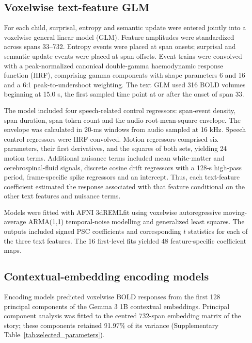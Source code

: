 \subsection{Voxelwise text-feature GLM}
For each child, surprisal, entropy and semantic update were entered jointly into a voxelwise general linear model (GLM). Feature amplitudes were standardized across spans 33--732. Entropy events were placed at span onsets; surprisal and semantic-update events were placed at span offsets. Event trains were convolved with a peak-normalized canonical double-gamma haemodynamic response function (HRF), comprising gamma components with shape parameters 6 and 16 and a 6:1 peak-to-undershoot weighting. The text GLM used 316 BOLD volumes beginning at 15.0 s, the first sampled time point at or after the onset of span 33.

The model included four speech-related control regressors: span-event density, span duration, span token count and the audio root-mean-square envelope. The envelope was calculated in 20-ms windows from audio sampled at 16 kHz. Speech control regressors were HRF-convolved. Motion regressors comprised six parameters, their first derivatives, and the squares of both sets, yielding 24 motion terms. Additional nuisance terms included mean white-matter and cerebrospinal-fluid signals, discrete cosine drift regressors with a 128-s high-pass period, frame-specific spike regressors and an intercept. Thus, each text-feature coefficient estimated the response associated with that feature conditional on the other text features and nuisance terms.

Models were fitted with AFNI 3dREMLfit using voxelwise autoregressive moving-average ARMA(1,1) temporal-noise modelling and generalized least squares\cite{afni,arma}. The outputs included signed PSC coefficients and corresponding $t$ statistics for each of the three text features. The 16 first-level fits yielded 48 feature-specific coefficient maps.

\subsection{Contextual-embedding encoding models}
Encoding models predicted voxelwise BOLD responses from the first 128 principal components of the Gemma 3 1B contextual embeddings. Principal component analysis was fitted to the centred 732-span embedding matrix of the story; these components retained 91.97\% of its variance (Supplementary Table~\ref{tab:selected_parameters}).

